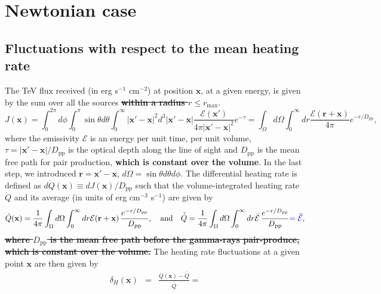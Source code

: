 \documentclass[numberedappendix]{emulateapj}
\newcommand\ALc[1]{{\color{red} \bf #1}} %
\newcommand\Cc[1]{{\color{blue} \bf #1}} %
\begin{document}
{\section {Newtonian case}\label{sec:windon_newt}
\subsection {Fluctuations with respect to the mean heating rate}

The TeV flux received (in erg s$^{-1}$ cm$^{-2}$) at position $\mathbf{x}$, at a given energy, is given by the sum over all the sources \ALc{\sout{within a radius $r\leqslant r_{\mathrm{max}}$}}.
\begin{equation}
  \label{eq:flux_recu0}
  J(\mathbf{x})=
  \int_{0}^{2\pi}d\phi\int_{0}^{\pi}\sin\theta d\theta\int_0^{\infty}|\mathbf{x}'-\mathbf{x}|^2 d^3|\mathbf{x}'-\mathbf{x}|
  \frac{\mathcal{E}(\mathbf{x}') }{4\pi |\mathbf{x}'-\mathbf{x}|^2} e^{-\tau}
  =\int_{\Omega} d\Omega\int_0^{\infty} dr \frac{\mathcal{E}(\mathbf{r}+\mathbf{x}) }{4\pi } e^{- r/D_{\mathrm{pp}}},
\end{equation}
where the emissivity $\mathcal{E}$ is an energy per unit time, per unit volume, $\tau=|\mathbf{x}'-\mathbf{x}|/D_{\mathrm{pp}}$ is the optical depth along the line of sight and $D_{\mathrm{pp}}$ is the mean free path for pair production, \ALc{which is constant over the volume}. In the last step, we introduced $\mathbf{r}=\mathbf{x}'-\mathbf{x}$, $d\Omega=\sin\theta d\theta d\phi$. The differential heating rate is defined as $d\dot{Q}(\mathbf{x})\equiv dJ(\mathbf{x})/D_{\mathrm{pp}}$ such that the volume-integrated heating rate $\dot{Q}$ and its average (in units of erg cm$^{-3}$ s$^{-1}$) are given by 
\begin{equation}
  \label{eq:heating_rate0}
  \dot{Q}(\mathbf{x})=
  \frac{1}{4\pi}   \int_{\Omega}d\Omega\int_0^{\infty} dr \mathcal{E}(\mathbf{r}+\mathbf{x})\, \frac{e^{-r/D_{\mathrm{pp}}}}{D_{\mathrm{pp}}},\quad\mbox{and}\quad
  \bar{\dot{Q}}= \frac{1}{4\pi}   \int_{\Omega}d\Omega\int_0^{\infty} dr \bar{\mathcal{E}} \,\frac{e^{-r/D_{\mathrm{pp}}}}{D_{\mathrm{pp}}} \Cc{= \bar{\mathcal{E}}},
\end{equation}
\ALc{\sout{where $D_{\mathrm{pp}}$ is the mean free path before the gamma-rays pair-produce, which is constant over the volume.}}
The heating rate fluctuations at a given point $\mathbf{x}$ are then given by 
\begin{eqnarray}
  \label{eq:heat_fluc_newt0}
  \delta_H(\mathbf{x})&=&\frac{\dot{Q}(\mathbf{x})-\bar{\dot{Q}}}{\bar{\dot{Q}}}=

\end{eqnarray}}
\end{document}

